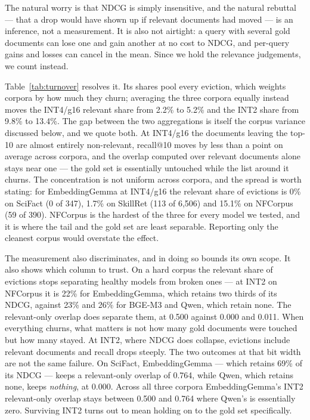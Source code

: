 \documentclass[11pt]{article}
\begin{document}
The natural worry is that NDCG is simply insensitive, and the natural rebuttal --- that a
drop would have shown up if relevant documents had moved --- is an inference, not a
measurement. It is also not airtight: a query with several gold documents can lose one and
gain another at no cost to NDCG, and per-query gains and losses can cancel in the mean. Since
we hold the relevance judgements, we count instead.



Table~\ref{tab:turnover} resolves it. Its shares pool every eviction, which weights corpora
by how much they churn; averaging the three corpora equally instead moves the INT4/g16 relevant
share from 2.2\% to 5.2\% and the INT2 share from 9.8\% to 13.4\%. The gap between the two
aggregations is itself the corpus variance discussed below, and we quote both. At INT4/g16 the documents leaving the top-10 are almost
entirely non-relevant, recall@10 moves by less than a point on average across corpora, and the overlap computed over relevant
documents alone stays near one --- the gold set is essentially untouched while the list around
it churns. The concentration is not uniform across corpora, and the spread is
worth stating: for EmbeddingGemma at INT4/g16 the relevant share of evictions is 0\% on SciFact
(0 of 347), 1.7\% on SkillRet (113 of 6{,}506) and 15.1\% on NFCorpus (59 of 390). NFCorpus
is the hardest of the three for every model we tested, and it is where the tail and the gold
set are least separable. Reporting only the cleanest corpus would overstate the effect.

The measurement also discriminates, and in doing so bounds its own scope. It also shows which
column to trust. On a hard corpus the relevant share of evictions stops separating healthy
models from broken ones --- at INT2 on NFCorpus it is 22\% for EmbeddingGemma, which retains
two thirds of its NDCG, against 23\% and 26\% for BGE-M3 and Qwen, which retain none. The
relevant-only overlap does separate them, at 0.500 against 0.000 and 0.011. When everything
churns, what matters is not how many gold documents were touched but how many stayed. At INT2, where NDCG
does collapse, evictions include relevant documents and recall drops steeply. The two
outcomes at that bit width are not the same failure. On SciFact, EmbeddingGemma --- which
retains 69\% of its NDCG --- keeps a relevant-only overlap of 0.764, while Qwen, which
retains none, keeps \emph{nothing}, at 0.000. Across all three corpora EmbeddingGemma's INT2
relevant-only overlap stays between 0.500 and 0.764 where Qwen's is essentially zero.
Surviving INT2 turns out to mean holding on to the gold set specifically.
\end{document}
